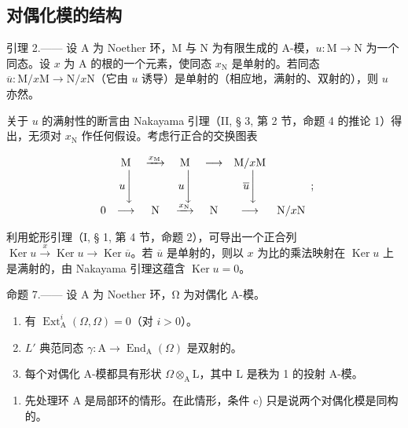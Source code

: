 \subsection{对偶化模的结构}

引理 2.—— 设 A 为 Noether 环，M 与 N 为有限生成的 A-模，\(u: \mathrm{M} \to \mathrm{N}\) 为一个同态。设 \(x\) 为 A 的根的一个元素，使同态 \(x_{\mathrm{N}}\) 是单射的。若同态 \(\overline{u}: \mathrm{M}/x\mathrm{M} \to \mathrm{N}/x\mathrm{N}\)（它由 \(u\) 诱导）是单射的（相应地，满射的、双射的），则 \(u\) 亦然。

关于 \(u\) 的满射性的断言由 Nakayama 引理（II, § 3, 第 2 节，命题 4 的推论 1）得出，无须对 \(x_{\mathrm{N}}\) 作任何假设。考虑行正合的交换图表

\[
\begin{array}{c c c c c c c} & \mathrm{M} & \xrightarrow {x _ {\mathrm{M}}} & \mathrm{M} & \longrightarrow & \mathrm{M} / x \mathrm{M} \\ & u \Bigg \downarrow & & u \Bigg \downarrow & & \overline {{u}} \Bigg \downarrow \\ 0 & \longrightarrow & \mathrm{N} & \xrightarrow {x _ {\mathrm{N}}} & \mathrm{N} & \longrightarrow & \mathrm{N} / x \mathrm{N} \end{array} ;
\]

利用蛇形引理（I, § 1, 第 4 节，命题 2），可导出一个正合列 \(\operatorname{Ker} u \xrightarrow{x} \operatorname{Ker} u \longrightarrow \operatorname{Ker} \overline{u}\)。若 \(\overline{u}\) 是单射的，则以 \(x\) 为比的乘法映射在 \(\operatorname{Ker} u\) 上是满射的，由 Nakayama 引理这蕴含 \(\operatorname{Ker} u = 0\)。

命题 7.—— 设 A 为 Noether 环，Ω 为对偶化 A-模。

\begin{enumerate}
\def\labelenumi{\alph{enumi})}
\item
  有 \(\operatorname{Ext}_{\mathrm{A}}^{i}(\Omega, \Omega) = 0\)（对 \(i > 0\)）。
\item
  \(L'\) 典范同态 \(\gamma : \mathrm{A} \to \operatorname{End}_{\mathrm{A}}(\Omega)\) 是双射的。
\item
  每个对偶化 A-模都具有形状 \(\Omega\otimes_{\mathrm{A}}\mathrm{L}\)，其中 \(\mathrm{L}\) 是秩为 1 的投射 A-模。
\end{enumerate}

\begin{enumerate}
\def\labelenumi{\Alph{enumi})}
\tightlist
\item
  先处理环 A 是局部环的情形。在此情形，条件 c) 只是说两个对偶化模是同构的。
\end{enumerate}

